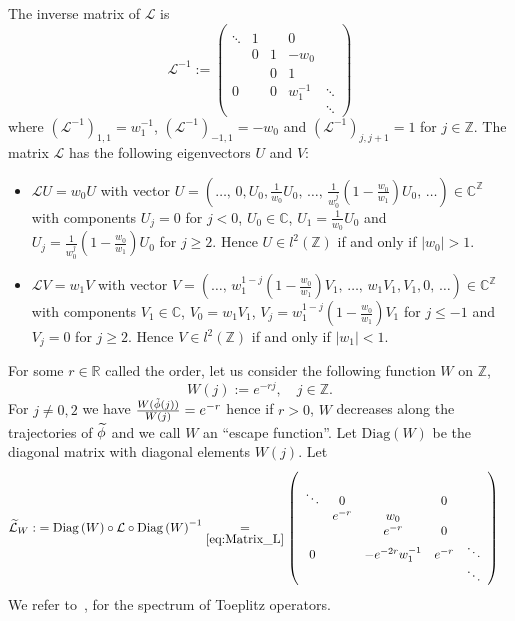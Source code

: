 \documentclass[AHL,Unicode,longabstracts,published]{cedram}
\newcommand{\clL}{\mathcal{L}}
\newcommand{\Diag}{\mathrm{Diag}}
\newcommand{\bbR}{\mathbb{R}}
\newcommand{\bbC}{\mathbb{C}}
\newcommand{\bbZ}{\mathbb{Z}}
\let\oldtilde\tilde
\renewcommand*{\tilde}[1]{\mathchoice{\widetilde{#1}}{\widetilde{#1}}{\oldtilde{#1}}{\oldtilde{#1}}}
\newcommand{\bbR}{\mathbb{R}}
\begin{document}
\begin{rema}\label{rem:The-inverse-of}
The inverse matrix of $\clL$ is
\begin{equation}\label{eq:Matrix_L-1}
\clL^{-1}:=\left(
\begin{array}{ccccc}
\\
\ddots & 1 & & 0\\
& 0 & 1 & -w_{0}\\
& & 0 & 1\\
0 & & 0 & w_{1}^{-1} & \ddots\\
& & & & \ddots
\end{array}\right)
\end{equation}
where $(\clL^{-1})_{1,1}=w_{1}^{-1}$, $(\clL^{-1})_{-1,1}=-w_{0}$ and $(\clL^{-1})_{j,j+1}=1$ for $j\in\bbZ$. The matrix $\clL$ has the following eigenvectors $U$ and $V$:
\begin{itemize}
\item $\clL U=w_{0}U$ with vector $U=(\ldots,\,0,U_{0},\frac{1}{w_{0}}U_{0},\,\ldots,\,\frac{1}{w_{0}^{j}}(1-\frac{w_{0}}{w_{1}})U_{0},\,\ldots)\in\bbC^{\bbZ}$ with components $U_{j}=0$ for $j<0$, $U_{0}\in\bbC$, $U_{1}=\frac{1}{w_{0}}U_{0}$ and $U_{j}=\frac{1}{w_{0}^{j}}(1-\frac{w_{0}}{w_{1}})U_{0}$ for $j\geq2$. Hence $U\in l^{2}(\bbZ)$ if and only if $|w_{0}|>1$.
\item $\clL V=w_{1}V$ with vector $V=(\ldots,\,w_{1}^{1-j}(1-\frac{w_{0}}{w_{1}})V_{1},\,\ldots,\,w_{1}V_{1},V_{1},0,\,\ldots)\in\bbC^{\bbZ}$ with components $V_{1}\in\bbC$, $V_{0}=w_{1}V_{1}$, $V_{j}=w_{1}^{1-j}(1-\frac{w_{0}}{w_{1}})V_{1}$ for $j\leq-1$ and $V_{j}=0$ for $j\geq2$. Hence $V\in l^{2}(\bbZ)$ if and only if $|w_{1}|<1$.
\end{itemize}
\end{rema}

For some $r\in\bbR$ called the order, let us consider the following function $W$ on $\bbZ$,
\[
W\left(j\right):=e^{-rj},\quad j\in\bbZ.
\]
For $j\neq0,2$ we have $\frac{W(\tilde{\phi}(j))}{W(j)}=e^{-r}$ hence if $r>0$, $W$ decreases along the trajectories of $\tilde{\phi}$ and we call $W$ an ``escape function''. Let $\Diag(W)$ be the diagonal matrix with diagonal elements $W(j)$. Let
\begin{align}\label{eq:def_L_tilde_W}
\tilde{\clL}_{W}: & =\Diag\left(W\right)\circ\clL\circ\Diag\left(W\right)^{-1}\underset{\eqref{eq:Matrix_L}}{=}\left(
\begin{array}{ccccc}
\\
\ddots & 0 & & 0\\
& e^{-r} & w_{0}\\
& & e^{-r} & 0\\
0 & & -e^{-2r}w_{1}^{-1} & e^{-r} & \ddots\\
& & & & \ddots
\end{array}\right)
\end{align}
We refer to~\cite[Chap.~1]{bottcher2012introduction}, \cite[p.~51]{trefethen_book_05} for the spectrum of Toeplitz operators.
\end{document}

